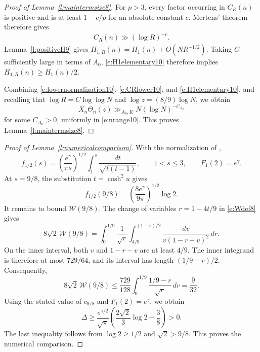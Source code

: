 \documentclass[12pt,reqno]{amsart}
\numberwithin{equation}{section}
\theoremstyle{definition}
\theoremstyle{remark}
\begin{document}
\begin{proof}[Proof of Lemma~\ref{l:maintermsize8}]
For \(p>3\), every factor occurring in \(C_R(n)\) is positive and is
at least \(1-c/p\) for an absolute constant \(c\).  Mertens' theorem
therefore gives
\begin{align}\label{e:CRlower10}
 C_R(n)\gg(\log R)^{-c}.
\end{align}
Lemma~\ref{l:positiveH9} gives
\(H_{1,R}(n)=H_1(n)+O(NR^{-1/2})\). Taking \(C\) sufficiently large in terms of \(A_0\), \eqref{e:H1elementary10} therefore implies
\(H_{1,R}(n)\geq H_1(n)/2\).



Combining \eqref{e:lowernormalization10}, \eqref{e:CRlower10}, and
\eqref{e:H1elementary10}, and recalling that
\(\log R=C\log\log N\) and \(\log z=(8/9)\log N\), we obtain
\[
 X_n\Theta_n(z)
 \gg_{A_0,K} N(\log N)^{-C_{A_0}}
\]
for some \(C_{A_0}>0\), uniformly in \eqref{e:nrange10}.  This proves
Lemma~\ref{l:maintermsize8}.
\end{proof}

\begin{proof}[Proof of Lemma~\ref{l:numericalcomparison}]
With the normalization of \cite[(1.8)--(1.10)]{I80},
\[
 f_{1/2}(s)=
 \left(\frac{e^\gamma}{\pi s}\right)^{1/2}
 \int_1^s\frac{dt}{\sqrt{t(t-1)}},
 \qquad 1<s\leq3,
 \qquad F_1(2)=e^\gamma.
\]
At \(s=9/8\), the substitution \(t=\cosh^2 u\) gives
\[
 f_{1/2}(9/8)
 =\left(\frac{8e^\gamma}{9\pi}\right)^{1/2}\log2.
\]
It remains to bound \(\mathcal W(9/8)\). The change of variables
\(r=1-4t/9\) in \eqref{e:Wdef8} gives
\[
 8\sqrt2\,\mathcal W(9/8)
 =\int_0^{1/9}\frac1{\sqrt r}
   \int_{4/9}^{(1-r)/2}\frac{dv}{v(1-r-v)^2}\,dr.
\]
On the inner interval, both \(v\) and \(1-r-v\) are at least \(4/9\).
The inner integrand is therefore at most \(729/64\), and its interval
has length \((1/9-r)/2\). Consequently,
\[
 8\sqrt2\,\mathcal W(9/8)
 \leq\frac{729}{128}\int_0^{1/9}\frac{1/9-r}{\sqrt r}\,dr
 =\frac9{32}.
\]
Using the stated value of \(c_{9/8}\) and \(F_1(2)=e^\gamma\), we obtain
\[
 \Delta\geq\frac{e^{\gamma/2}}{\sqrt\pi}
   \left(\frac{2\sqrt2}{3}\log2-\frac38\right)>0.
\]
The last inequality follows from \(\log2\geq1/2\) and \(\sqrt2>9/8\).
This proves the numerical comparison.
\end{proof}






 
\end{document}
